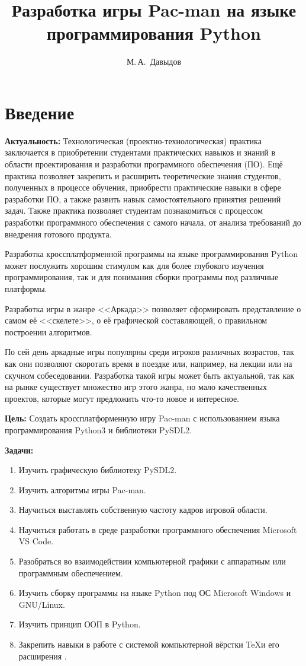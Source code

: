\documentclass[14pt, oneside]{altsu-report}
\title{Разработка игры Pac-man на языке программирования Python}
\author{М.\,А.~Давыдов}
\institute{Институт цифровых технологий, электроники и физики}
\date{\the\year}
\begin{document}
\maketitle

\setcounter{page}{2}
\makeabstract
\tableofcontents

\chapter*{Введение}

\textbf{Актуальность:}
Технологическая (проектно-технологическая) практика заключается в приобретении студентами практических навыков и знаний в области проектирования и разработки программного обеспечения (ПО). Ещё практика позволяет закрепить и расширить теоретические знания студентов, полученных в процессе обучения, приобрести практические навыки в сфере разработки ПО, а также развить навык самостоятельного принятия решений задач. Также практика позволяет студентам познакомиться с процессом разработки программного обеспечения с самого начала, от анализа требований до внедрения готового продукта.

Разработка кроссплатформенной программы на языке программирования Python может послужить хорошим стимулом как для более глубокого изучения программирования, так и для понимания сборки программы под различные платформы.

Разработка игры в жанре <<Аркада>> позволяет сформировать представление о самом её <<скелете>>, о её графической составляющей, о правильном построении алгоритмов.

По сей день аркадные игры популярны среди игроков различных возрастов, так как они позволяют скоротать время в поездке или, например, на лекции или на скучном собеседовании. Разработка такой игры может быть актуальной, так как на рынке существует множество игр этого жанра, но мало качественных проектов, которые могут предложить что-то новое и интересное.

\textbf{Цель:}
Создать кроссплатформенную игру Pac-man с использованием языка программирования Python3 и библиотеки PySDL2.

\textbf{\label{zadachi}Задачи:}
\begin{enumerate}
	\item Изучить графическую библиотеку PySDL2.
	\item Изучить алгоритмы игры Pac-man.
	\item Научиться выставлять собственную частоту кадров игровой области.
	\item Научиться работать в среде разработки программного обеспечения Microsoft VS Code.
	\item Разобраться во взаимодействии компьютерной графики с аппаратным или программным обеспечением.
	\item Изучить сборку программы на языке Python под ОС Microsoft Windows и GNU/Linux.
	\item Изучить принцип ООП в Python.
	\item Закрепить навыки в работе с системой компьютерной вёрстки \TeX и его расширения \XeTeX.
\end{enumerate}
\end{document}

